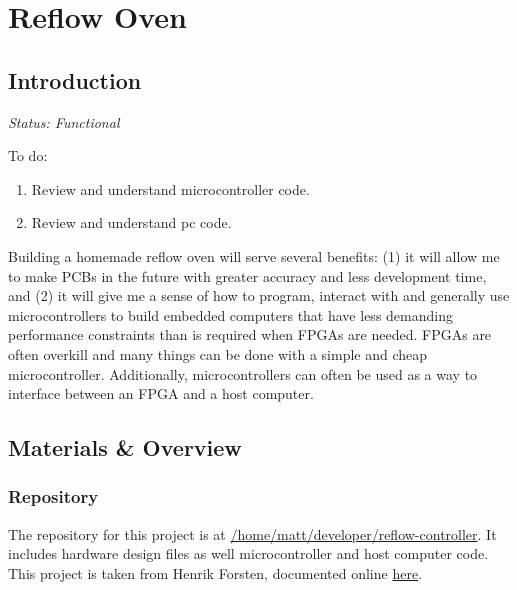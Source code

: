 \documentclass[11pt,twoside,a4paper]{report}
\begin{document}
\tableofcontents


\section{Reflow Oven}

\subsection{Introduction}

\textit{Status: Functional}\newline

To do:
\begin{enumerate}
\item Review and understand microcontroller code.
\item Review and understand pc code.
\end{enumerate}

Building a homemade reflow oven will serve several benefits: (1) it will allow me to make PCBs in
the future with greater accuracy and less development time, and (2) it will give me a sense of how
to program, interact with and generally use microcontrollers to build embedded computers that have
less demanding performance constraints than is required when FPGAs are needed. FPGAs are often
overkill and many things can be done with a simple and cheap microcontroller. Additionally,
microcontrollers can often be used as a way to interface between an FPGA and a host computer.

\subsection{Materials \& Overview}

\subsubsection{Repository}
The repository for this project is at
\href{run:/home/matt/developer/reflow-controller}{/home/matt/developer/reflow-controller}. It
includes hardware design files as well microcontroller and host computer code. This project is taken
from Henrik Forsten, documented online
\href{http://hforsten.com/toaster-oven-reflow-controller.html}{here}.
\end{document}

